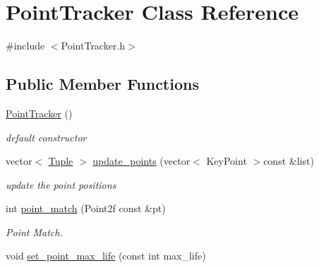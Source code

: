 \hypertarget{class_point_tracker}{
\section{\-Point\-Tracker \-Class \-Reference}
\label{class_point_tracker}
}


{\ttfamily \#include $<$\-Point\-Tracker.\-h$>$}

\subsection*{\-Public \-Member \-Functions}
\begin{DoxyCompactItemize}
\item 
\hyperlink{class_point_tracker_a9604754cd19cab5f984e4b861c4049d4}{\-Point\-Tracker} ()
\begin{DoxyCompactList}\small\item\em default constructor \end{DoxyCompactList}\item 
vector$<$ \hyperlink{class_tuple}{\-Tuple} $>$ \hyperlink{class_point_tracker_a48270ad5bc84c22c20d84435f85b63be}{update\-\_\-points} (vector$<$ \-Key\-Point $>$const \&list)
\begin{DoxyCompactList}\small\item\em update the point positions \end{DoxyCompactList}\item 
int \hyperlink{class_point_tracker_ac29873729216df07d202485caaab0f20}{point\-\_\-match} (\-Point2f const \&pt)
\begin{DoxyCompactList}\small\item\em \-Point \-Match. \end{DoxyCompactList}\item 
void \hyperlink{class_point_tracker_a6333fab2cae4b6e140cf99e0159dc5cc}{set\-\_\-point\-\_\-max\-\_\-life} (const int max\-\_\-life)
\end{DoxyCompactItemize}
